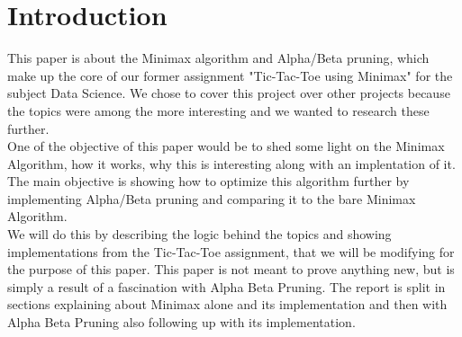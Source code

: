 \section{Introduction}
\label{sec:introduction} %
This paper is about the Minimax algorithm and Alpha/Beta pruning, which make up the core of our former assignment 
"Tic-Tac-Toe using Minimax" for the subject Data Science. We chose to cover this project over other projects because 
the topics were among the more interesting and we wanted to research these further.
\\
One of the objective of this paper would be to shed some light on the Minimax Algorithm, 
how it works, why this is interesting along with an implentation of it.
The main objective is showing how to optimize this algorithm further by implementing Alpha/Beta pruning and comparing 
it to the bare Minimax Algorithm.
\\
We will do this by describing the logic behind the topics and showing implementations from the Tic-Tac-Toe assignment,
that we will be modifying for the purpose of this paper.
This paper is not meant to prove anything new, but is simply a result of a fascination with Alpha Beta Pruning.
The report is split in sections explaining about Minimax alone and its implementation and then with Alpha Beta Pruning 
also following up with its implementation.
\clearpage